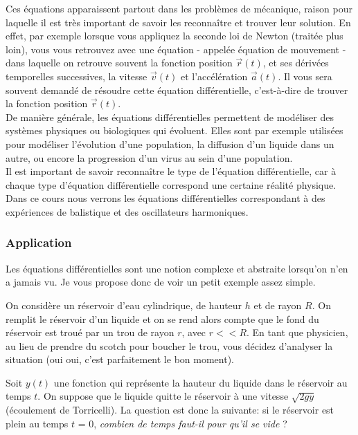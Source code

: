 \documentclass{article}
\begin{document}
Ces équations apparaissent partout dans les problèmes de mécanique, raison pour laquelle il est très important de savoir les reconnaître et trouver leur solution. En effet, par exemple lorsque vous appliquez la seconde loi de Newton (traitée plus loin), vous vous retrouvez avec une équation - appelée équation de mouvement - dans laquelle on retrouve souvent la fonction position $\vec{r}(t)$, et ses dérivées temporelles successives, la vitesse $\vec{v}(t)$ et l'accélération $\vec{a}(t)$.
Il vous sera souvent demandé de résoudre cette équation différentielle, c'est-à-dire de trouver la fonction position $\vec{r}(t)$.\\
De manière générale, les équations différentielles permettent de modéliser des systèmes physiques ou biologiques qui évoluent. Elles sont par exemple utilisées pour modéliser l'évolution d'une population, la diffusion d'un liquide dans un autre, ou encore la progression d'un virus au sein d'une population.\\
Il est important de savoir reconnaître le type de l'équation différentielle, car à chaque type d'équation différentielle correspond une certaine réalité physique. Dans ce cours nous verrons les équations différentielles correspondant à des expériences de balistique et des oscillateurs harmoniques. 

\subsubsection{Application}
Les équations différentielles sont une notion complexe et abstraite lorsqu'on n'en a jamais vu. Je vous propose donc de voir un petit exemple assez simple.
\begin{tcolorbox}[title=Enoncé]

\indent On considère un réservoir d'eau cylindrique, de hauteur $h$ et de rayon $R$. On remplit le réservoir d'un liquide et on se rend alors compte que le fond du réservoir est troué par un trou de rayon $r$, avec $r << R$. En tant que physicien, au lieu de prendre du scotch pour boucher le trou, vous décidez d'analyser la situation (oui oui, c'est parfaitement le bon moment). 

\indent Soit $y(t)$ une fonction qui représente la hauteur du liquide dans le réservoir au temps $t$. On suppose que le liquide quitte le réservoir à une vitesse $\sqrt{2gy}$ (écoulement de Torricelli). La question est donc la suivante: si le réservoir est plein au temps $t$ = 0, \textit{combien de temps faut-il pour qu'il se vide} ?
\end{tcolorbox} 
\end{document}

